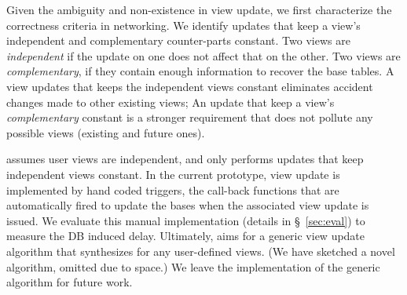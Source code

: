 Given the ambiguity and non-existence in view update, we first
characterize the correctness criteria in networking. We identify
updates that keep a view's independent and complementary counter-parts
constant. Two views are \textit{independent} if the update on one does
not affect that on the other. Two views are \textit{complementary}, if
they contain enough information to recover the base tables.
A view updates that keeps the independent views constant eliminates
accident changes made to other existing views; An update that keep a
view's \textit{complementary} constant is a stronger requirement that
does not pollute any possible views (existing and future ones).

\Sys assumes user views are independent, and only performs updates
that keep independent views constant.  In the current prototype, view
update is implemented by hand coded triggers, the call-back functions
that are automatically fired to update the bases when the associated
view update is issued. We evaluate this manual implementation (details
in \S~\ref{sec:eval}) to measure the DB induced delay.
Ultimately, \Sys aims for a generic view update algorithm that
synthesizes for any user-defined views. (We have sketched a novel
algorithm, omitted due to space.) We leave the implementation of the
generic algorithm for future work.

% 
